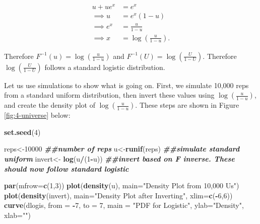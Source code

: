 \documentclass[
]{book}
\newenvironment{Shaded}{\begin{snugshade}}{\end{snugshade}}
\newcommand{\AttributeTok}[1]{\textcolor[rgb]{0.13,0.29,0.53}{#1}}
\newcommand{\DecValTok}[1]{\textcolor[rgb]{0.00,0.00,0.81}{#1}}
\newcommand{\DocumentationTok}[1]{\textcolor[rgb]{0.56,0.35,0.01}{\textbf{\textit{#1}}}}
\newcommand{\FunctionTok}[1]{\textcolor[rgb]{0.13,0.29,0.53}{\textbf{#1}}}
\newcommand{\NormalTok}[1]{#1}
\newcommand{\OtherTok}[1]{\textcolor[rgb]{0.56,0.35,0.01}{#1}}
\newcommand{\SpecialCharTok}[1]{\textcolor[rgb]{0.81,0.36,0.00}{\textbf{#1}}}
\newcommand{\StringTok}[1]{\textcolor[rgb]{0.31,0.60,0.02}{#1}}
\begin{document}
\[
\begin{split}
u + u e^x &= e^x\\
\implies u &= e^x (1-u) \\
\implies e^x &= \frac{u}{1-u} \\
\implies x &= \log (\frac{u}{1-u}).
\end{split}
\]

Therefore \(F^{-1}(u) = \log (\frac{u}{1-u})\) and \(F^{-1}(U) = \log (\frac{U}{1-U})\). Therefore \(\log (\frac{U}{1-U})\) follows a standard logistic distribution.

Let us use simulations to show what is going on. First, we simulate 10,000 reps from a standard uniform distribution, then invert these values using \(\log (\frac{u}{1-u})\), and create the density plot of \(\log (\frac{u}{1-u})\). These steps are shown in Figure \ref{fig:4-universe} below:

\begin{Shaded}
\begin{Highlighting}[]
\FunctionTok{set.seed}\NormalTok{(}\DecValTok{4}\NormalTok{)}

\NormalTok{reps}\OtherTok{\textless{}{-}}\DecValTok{10000} \DocumentationTok{\#\#number of reps}
\NormalTok{u}\OtherTok{\textless{}{-}}\FunctionTok{runif}\NormalTok{(reps) }\DocumentationTok{\#\#simulate standard uniform}
\NormalTok{invert}\OtherTok{\textless{}{-}} \FunctionTok{log}\NormalTok{(u}\SpecialCharTok{/}\NormalTok{(}\DecValTok{1}\SpecialCharTok{{-}}\NormalTok{u)) }\DocumentationTok{\#\#invert based on F inverse. These should now follow standard logistic}

\FunctionTok{par}\NormalTok{(}\AttributeTok{mfrow=}\FunctionTok{c}\NormalTok{(}\DecValTok{1}\NormalTok{,}\DecValTok{3}\NormalTok{))}
\FunctionTok{plot}\NormalTok{(}\FunctionTok{density}\NormalTok{(u), }\AttributeTok{main=}\StringTok{"Density Plot from 10,000 U\textquotesingle{}s"}\NormalTok{)}
\FunctionTok{plot}\NormalTok{(}\FunctionTok{density}\NormalTok{(invert), }\AttributeTok{main=}\StringTok{"Density Plot after Inverting"}\NormalTok{, }\AttributeTok{xlim=}\FunctionTok{c}\NormalTok{(}\SpecialCharTok{{-}}\DecValTok{6}\NormalTok{,}\DecValTok{6}\NormalTok{))}
\FunctionTok{curve}\NormalTok{(dlogis, }\AttributeTok{from =} \SpecialCharTok{{-}}\DecValTok{7}\NormalTok{, }\AttributeTok{to =} \DecValTok{7}\NormalTok{, }\AttributeTok{main =} \StringTok{"PDF for Logistic"}\NormalTok{, }\AttributeTok{ylab=}\StringTok{"Density"}\NormalTok{, }\AttributeTok{xlab=}\StringTok{""}\NormalTok{)}
\end{Highlighting}
\end{Shaded}
\end{document}
